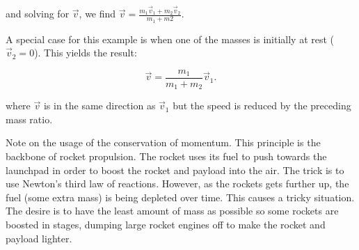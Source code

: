 \noindent and solving for $\vec{v}$, we find $\vec{v} = \frac{m_1 \vec{v}_1 + m_2 \vec{v}_2}{m_1 + m2}$.

A special case for this example is when one of the masses is initially at rest ($\vec{v}_2 = 0$). This yields the result:

\begin{equation*}
    \vec{v} = \frac{m_1}{m_1 + m_2}\vec{v}_1.
\end{equation*}

\noindent where $\vec{v}$ is in the same direction as $\vec{v}_1$ but the speed is reduced by the preceding mass ratio.

{\exend}

Note on the usage of the conservation of momentum.
This principle is the backbone of rocket propulsion. The rocket uses its fuel to push towards the launchpad in order to boost the rocket and payload into the air. The trick is to use Newton's third law of reactions. However, as the rockets gets further up, the fuel (some extra mass) is being depleted over time. This causes a tricky situation. The desire is to have the least amount of mass as possible so some rockets are boosted in stages, dumping large rocket engines off to make the rocket and payload lighter.
